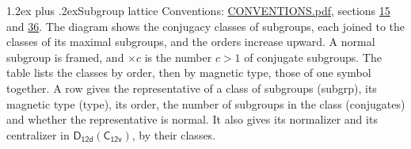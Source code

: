 \documentclass[10pt,a4paper]{article}
\makeatletter
\renewcommand\section{\@startsection{section}{1}{\z@}{-3ex plus -1ex minus -.2ex}%
  {1.2ex plus .2ex}{\normalfont\large\sffamily\bfseries\color{parttitle}}}
\numberwithin{equation}{section}
\newcommand{\grp}[1]{\mathsf{#1}}
\makeatother
\begin{document}
\section{Subgroup lattice}\label{s:subgroups}
Conventions: \href{../../CONVENTIONS.pdf}{CONVENTIONS.pdf}, sections \href{../../../rotation/CONVENTIONS.pdf\#conv.15}{15} and \href{../../CONVENTIONS.pdf\#conv.36}{36}.
The diagram shows the conjugacy classes of subgroups, each joined to the classes of its maximal subgroups, and the orders increase upward. \label{n:index.conjugates.c}\label{n:mark.conjugates}A normal subgroup is framed, and ${\times}c$ is the number $c > 1$ of conjugate subgroups. The table lists the classes by order, then by magnetic type, those of one symbol together. \label{n:head.subgroup}\label{n:head.magnetic.type}\label{n:head.order}\label{n:head.conjugates}\label{n:head.normal}A row gives the representative of a class of subgroups (subgrp), its magnetic type (type), its order, the number of subgroups in the class (conjugates) and whether the representative is normal. \label{n:head.normalizer}\label{n:head.centralizer}It also gives its normalizer and its centralizer in $\grp{D_{12d}}(\grp{C_{12v}})$, by their classes. 
\end{document}
